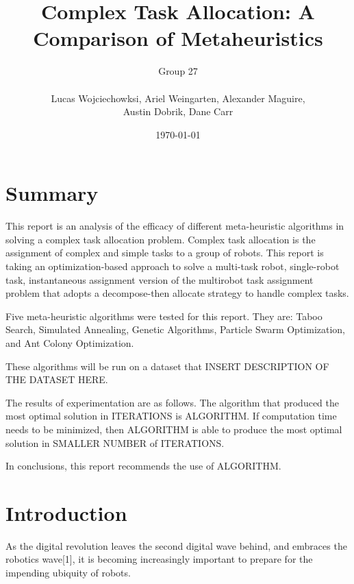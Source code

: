 \documentclass[a4paper]{article}
\title{Complex Task Allocation: A Comparison of Metaheuristics}
\author{
	Group 27 \\
	\\
	Lucas Wojciechowksi, Ariel Weingarten, Alexander Maguire, \\
	Austin Dobrik, Dane Carr}
\date{\today}
\begin{document}
\maketitle


\section*{Summary}
This report is an analysis of the efficacy of different meta-heuristic algorithms in solving a complex task allocation problem.
Complex task allocation is the assignment of complex and simple tasks to a group of robots. This report is taking an optimization-based approach to solve a multi-task robot, single-robot task, instantaneous assignment version of the multirobot task assignment problem that adopts a decompose-then allocate strategy to handle complex tasks.

Five meta-heuristic algorithms were tested for this report. They are: Taboo Search, Simulated Annealing, Genetic Algorithms, Particle Swarm Optimization, and Ant Colony Optimization.

These algorithms will be run on a dataset that INSERT DESCRIPTION OF THE DATASET HERE.

The results of experimentation are as follows. The algorithm that produced the most optimal solution in ITERATIONS is ALGORITHM.
If computation time needs to be minimized, then ALGORITHM is able to produce the most optimal solution in SMALLER NUMBER of ITERATIONS.

In conclusions, this report recommends the use of ALGORITHM.

\section{Introduction}
As the digital revolution leaves the second digital wave behind, and embraces the robotics wave[1], it is becoming increasingly important to prepare for the impending ubiquity of robots.
\end{document}
